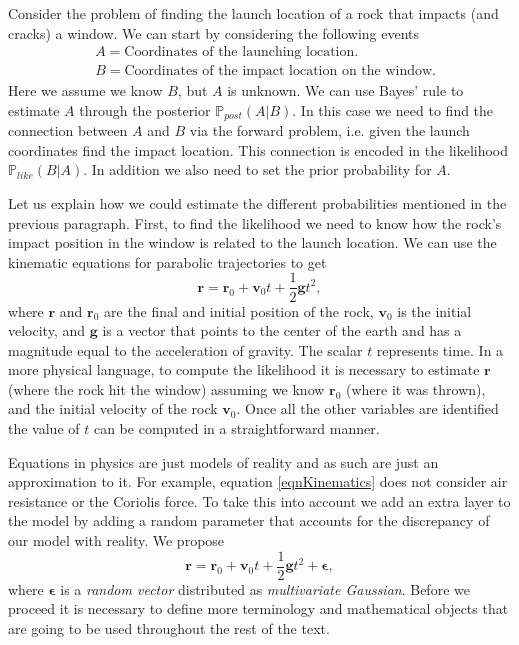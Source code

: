 \documentclass[12pt]{book}
\newcommand{\post}{\mathbb{P}_{post}}
\newcommand{\like}{\mathbb{P}_{like}}
\begin{document}
Consider the problem of finding the launch location of a rock that impacts (and cracks) a window. 
We can start by considering the following events
\begin{align*}
& A=\text{Coordinates of the launching location}.\\
& B= \text{Coordinates of the impact location on the window}.
\end{align*}
Here we assume we know $B$, but $A$ is unknown. We can use Bayes' rule to estimate $A$ through
the posterior $\post(A|B)$. In this case
we need to find the connection between $A$ and $B$ via the forward problem, i.e. given 
the launch coordinates find the impact location. This connection is encoded in the likelihood $\like(B|A)$.
In addition we also need to set the prior probability for $A$. 
\newline



Let us explain how we could estimate the different probabilities mentioned in the previous paragraph. 
First, to find the likelihood
we need to know how the rock's impact position  in the window  is related to the launch location. 
We can use
the kinematic equations  for parabolic trajectories to get \cite{arnol2013mathematical}
\begin{equation}\label{eqnKinematics}
\textbf{r}=\textbf{r}_{0}+\textbf{v}_{0}t+\frac{1}{2}\textbf{g}t^{2},
\end{equation} 
where $\textbf{r}$ and $\textbf{r}_{0}$ are the final and initial position of the rock, 
$\textbf{v}_{0}$ is 
the initial velocity,  and $\textbf{g}$ is  a vector that points to the center of the earth and has a 
magnitude equal to the acceleration of gravity. The scalar $t$ represents time.
In a more physical language, to compute the likelihood it is necessary to estimate $\textbf{r}$ (where the 
rock hit the window) assuming we know $\textbf{r}_{0}$ (where it was thrown), and the initial velocity 
of the rock $\textbf{v}_{0}$. 
Once all the other variables are identified the value of $t$ can be computed in a straightforward manner. 

Equations in physics are just models of reality and as such are just an approximation to it. 
For example, equation \eqref{eqnKinematics} does not consider air resistance or the
Coriolis force. To take
this into account we add an extra layer to the model by adding a random parameter that accounts
for the discrepancy of our model with reality. We propose 
\begin{equation}\label{eqnParabolicEpsilon}
\textbf{r}=\textbf{r}_{0}+\textbf{v}_{0}t+\frac{1}{2}\textbf{g}t^{2}+\mathbf{\epsilon},
\end{equation} 
where $\mathbf{\epsilon}$ is a \textit{random vector} distributed as \textit{multivariate Gaussian}. 
Before we proceed it is necessary to define more terminology and mathematical objects  that are going 
to be used throughout the rest of the text. 
\end{document}
